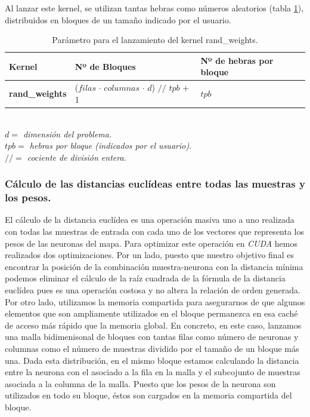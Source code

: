 Al lanzar este kernel, se utilizan tantas hebras como números aleatorios (tabla \ref{tab:randkernel}), distribuidos en bloques de un tamaño indicado por el usuario.
\begin{table}[ht]
\begin{tabular}{@{}lll@{}}
\toprule
\textbf{Kernel}        & \textbf{Nº de Bloques}                                 & \textbf{Nº de hebras por bloque}                                                                       \\ \midrule
\textbf{rand\_weights} & ($filas$ $\cdot$ $columnas$ $\cdot$ $d$) $//$ $tpb$ + 1 & $tpb$ \\ \bottomrule
\end{tabular}

\textit{\\$d=$ dimensión del problema.\\$tpb=$ hebras por bloque (indicados por el usuario).\\ $//=$ cociente de división entera.}
\caption{Parámetro para el lanzamiento del kernel rand\_weights.}
\label{tab:randkernel}
\end{table}



\subsubsection{Cálculo de las distancias euclídeas entre todas las muestras y los pesos.}
El cálculo de la distancia euclídea es una operación masiva uno a uno realizada con todas las muestras de entrada con cada uno de los vectores que representa los pesos de las neuronas del mapa. Para optimizar este operación en \textit{CUDA} hemos realizados dos optimizaciones. Por un lado, puesto que nuestro objetivo final es encontrar la posición de la combinación muestra-neurona con la distancia mínima podemos eliminar el cálculo de la raíz cuadrada de la fórmula de la distancia euclídea pues es una operación costosa y no altera la relación de orden generada. Por otro lado, utilizamos la memoria compartida para asegurarnos de que algunos elementos que son ampliamente utilizados en el bloque permanezca en esa caché de acceso más rápido que la memoria global. En concreto, en este caso, lanzamos una malla bidimenisonal de bloques con tantas filas como número de neuronas y columnas como el número de muestras dividido por el tamaño de un bloque más una. Dada esta distribución, en el mismo bloque estamos calculando la distancia entre la neurona con el asociado a la fila en la malla y el subcojunto de muestras asociada a la columna de la malla. Puesto que los pesos de la neurona son utilizados en todo su bloque, éstos son cargados en la memoria compartida del bloque.


